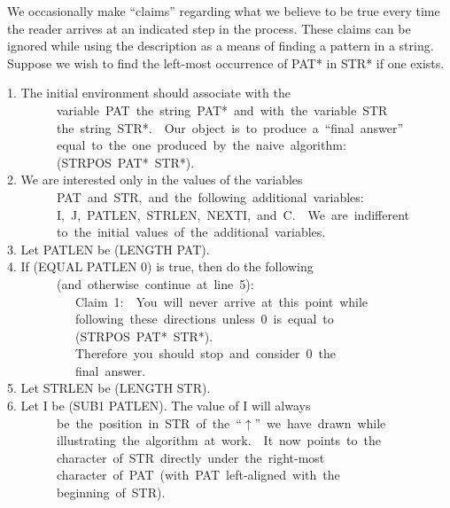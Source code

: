 \documentclass[10pt]{book}
\newenvironment{pubasis}{\begin{flushleft}}{\end{flushleft}}
\begin{document}
We  occasionally make ``claims'' regarding what we believe to be
true every time the reader arrives at an indicated step in the process.
These claims can be ignored while using the description as a
means of finding a pattern in a string.  Suppose we wish
to find the left-most occurrence of PAT* in STR* if one exists.
\begin{pubasis}
1.	The initial environment should associate with the\\
~~~~~~~~variable~PAT~the~string~PAT*~and~with~the~variable~STR\\
~~~~~~~~the~string~STR*.~~Our~object~is~to~produce~a~``final~answer''\\
~~~~~~~~equal~to~the~one~produced~by~the~naive~algorithm:\\
~~~~~~~~(STRPOS~PAT*~STR*).\\

2.	We are interested only in the values of the variables\\
~~~~~~~~PAT~and~STR,~and~the~following~additional~variables:\\
~~~~~~~~I,~J,~PATLEN,~STRLEN,~NEXTI,~and~C.~~We~are~indifferent\\
~~~~~~~~to~the~initial~values~of~the~additional~variables.\\

3.	Let PATLEN be (LENGTH PAT).\\

4.	If (EQUAL PATLEN 0) is true, then do the following\\
~~~~~~~~(and~otherwise~continue~at~line~5):\\

~~~~~~~~~~~Claim~1:~~You~will~never~arrive~at~this~point~while\\
~~~~~~~~~~~following~these~directions~unless~0~is~equal~to\\
~~~~~~~~~~~(STRPOS~PAT*~STR*).\\

~~~~~~~~~~~Therefore~you~should~stop~and~consider~0~the\\
~~~~~~~~~~~final~answer.\\

5.	Let STRLEN be (LENGTH STR).\\

6.	Let I be (SUB1 PATLEN).  The value of I will always\\
~~~~~~~~be~the~position~in~STR~of~the~``$\uparrow$''~we~have~drawn~while\\
~~~~~~~~illustrating~the~algorithm~at~work.~~It~now~points~to~the\\
~~~~~~~~character~of~STR~directly~under~the~right-most\\
~~~~~~~~character~of~PAT~(with~PAT~left-aligned~with~the\\
~~~~~~~~beginning~of~STR).\\


\end{pubasis}
\end{document}
